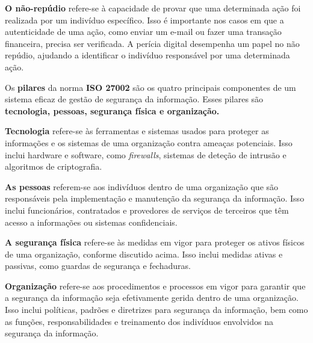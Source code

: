 \textbf{O não-repúdio} refere-se à capacidade de provar que uma determinada ação foi realizada por um indivíduo específico. Isso é importante nos casos em que a autenticidade de uma ação, como enviar um e-mail ou fazer uma transação financeira, precisa ser verificada. A perícia digital desempenha um papel no não repúdio, ajudando a identificar o indivíduo responsável por uma determinada ação.

Os \textbf{pilares} da norma \textbf{ISO 27002} são os quatro principais componentes de um sistema eficaz de gestão de segurança da informação. Esses pilares são \textbf{tecnologia, pessoas, segurança física e organização.}

\textbf{Tecnologia} refere-se às ferramentas e sistemas usados para proteger as informações e os sistemas de uma organização contra ameaças potenciais. Isso inclui hardware e software, como \textit{firewalls}, sistemas de deteção de intrusão e algoritmos de criptografia.

\textbf{As pessoas} referem-se aos indivíduos dentro de uma organização que são responsáveis pela implementação e manutenção da segurança da informação. Isso inclui funcionários, contratados e provedores de serviços de terceiros que têm acesso a informações ou sistemas confidenciais.

\textbf{A segurança física} refere-se às medidas em vigor para proteger os ativos físicos de uma organização, conforme discutido acima. Isso inclui medidas ativas e passivas, como guardas de segurança e fechaduras.

\textbf{Organização} refere-se aos procedimentos e processos em vigor para garantir que a segurança da informação seja efetivamente gerida dentro de uma organização. Isso inclui políticas, padrões e diretrizes para segurança da informação, bem como as funções, responsabilidades e treinamento dos indivíduos envolvidos na segurança da informação.

\newpage
